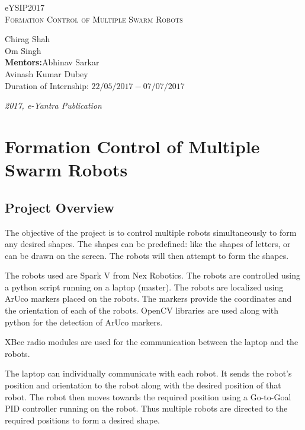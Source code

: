 \documentclass[a4paper,12pt,oneside]{book}
\begin{document}
	
	\begin{titlepage}
		\raggedright
		{\Large eYSIP2017\\[1cm]}
		{\Huge\scshape Formation Control of Multiple Swarm Robots \\[.1in]}
		\vfill
		\begin{flushright}
			{\large Chirag Shah \\}
			{\large Om Singh \\}
			{\large \textbf{Mentors:}Abhinav Sarkar \\}
			{\large Avinash Kumar Dubey\\}
			{\large Duration of Internship: $ 22/05/2017-07/07/2017 $ \\}
		\end{flushright}
		
		{\itshape 2017, e-Yantra Publication}
	\end{titlepage}
	
	\tableofcontents
	\pagebreak
	
	\chapter[Formation Control of Multiple Swarm Robots]{Formation Control of Multiple Swarm Robots}
	
		
	\section{Project Overview}
	
		The objective of the project is to control multiple robots simultaneously to form any desired shapes. The shapes can be predefined: like the shapes of letters, or can be drawn on the screen. The robots will then attempt to form the shapes.
		
		The robots used are Spark V from Nex Robotics. The robots are controlled using a python script running on a laptop (master). The robots are localized using ArUco markers placed on the robots. The markers provide the coordinates and the orientation of each of the robots. OpenCV libraries are used along with python for the detection of ArUco markers.
		
		XBee radio modules are used for the communication between the laptop and the robots.
		
		The laptop can individually communicate with each robot. It sends the robot's position and orientation to the robot along with the desired position of that robot. The robot then moves towards the required position using a Go-to-Goal PID controller running on the robot.	Thus multiple robots are directed to the required positions to form a desired shape.\\
		
\end{document}
